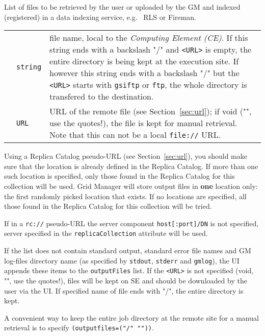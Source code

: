   List of files to be retrieved by the user or uploaded by the GM and
  indexed (registered) in a data indexing service, e.g. \globus\  RLS or Fireman.

  \begin{tabular}{llp{10cm}}
    \hspace*{1cm}&\texttt{string}& file name, local to the
    \textit{Computing Element (CE)}\index{Computing Element}. If this
    string ends with a backslash "/" and \verb#<URL># is empty, the
    entire directory is being kept at the execution site. If however
    this string ends with a backslash "/" but the \verb#<URL>#
    starts with \texttt{gsiftp} or \texttt{ftp}, the whole directory
    is transfered to the destination.\\
    \hspace*{1cm}&\texttt{URL} & URL of the remote file (see
    Section~\ref{sec:url}); if void ("", use the quotes!), the file is
    kept for manual retrieval.  Note that this can not be a local
    \texttt{file://} URL.\\
  \end{tabular}

  Using a Replica Catalog pseudo-URL (see Section~\ref{sec:url}), you should make
  sure that the location is already defined in the Replica Catalog. If more
  than one such location is specified, only those found in the Replica Catalog
  for this collection will be used. Grid Manager will store output files in
  \textbf{one} location only: the first randomly picked location that
  exists. If no locations are specified, all those found in the
  Replica Catalog for this collection will be tried.

  If in a \verb#rc://# pseudo-URL the server component \texttt{host[:port]/DN} is not
  specified, server specified in the \texttt{replicaCollection} attribute will be used.

  If the list does not contain standard output, standard error
  file names and GM log-files directory name (as specified by \texttt{stdout},
  \texttt{stderr} and \texttt{gmlog}), the UI appends these
  items to the \texttt{outputFiles} list. If the \verb#<URL># is not specified (void,
  "", use the quotes!), files will be kept on SE and should be downloaded 
  by the user via the UI. If specified name of file ends with "/", the 
  entire directory is kept.

  A convenient way to keep the entire job directory at the remote site
  for a manual retrieval is to specify \texttt{(outputfiles=("/" ""))}.


